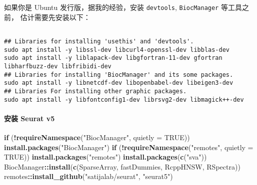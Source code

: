\documentclass[
]{article}
\newenvironment{Shaded}{\begin{snugshade}}{\end{snugshade}}
\newcommand{\ControlFlowTok}[1]{\textcolor[rgb]{0.13,0.29,0.53}{\textbf{#1}}}
\newcommand{\DataTypeTok}[1]{\textcolor[rgb]{0.13,0.29,0.53}{#1}}
\newcommand{\KeywordTok}[1]{\textcolor[rgb]{0.13,0.29,0.53}{\textbf{#1}}}
\newcommand{\NormalTok}[1]{#1}
\newcommand{\OperatorTok}[1]{\textcolor[rgb]{0.81,0.36,0.00}{\textbf{#1}}}
\newcommand{\OtherTok}[1]{\textcolor[rgb]{0.56,0.35,0.01}{#1}}
\newcommand{\StringTok}[1]{\textcolor[rgb]{0.31,0.60,0.02}{#1}}
\begin{document}
如果你是 Ubuntu 发行版，据我的经验，安装 \texttt{devtools}, \texttt{BiocManager} 等工具之前，
估计需要先安装以下：

\begin{tcolorbox}[colback = gray!10, colframe = red!50, width = 16cm, arc = 1mm, auto outer arc, title = {Bash input}]
\begin{verbatim}

## Libraries for installing 'usethis' and 'devtools'.
sudo apt install -y libssl-dev libcurl4-openssl-dev libblas-dev
sudo apt install -y liblapack-dev libgfortran-11-dev gfortran libharfbuzz-dev libfribidi-dev
## Libraries for installing 'BiocManager' and its some packages.
sudo apt install -y libnetcdf-dev libopenbabel-dev libeigen3-dev
## Libraries For installing other graphic packages.
sudo apt install -y libfontconfig1-dev librsvg2-dev libmagick++-dev

\end{verbatim}
\end{tcolorbox}

\hypertarget{ux5b89ux88c5-seurat-v5}{%
\paragraph{安装 Seurat v5}\label{ux5b89ux88c5-seurat-v5}}

\begin{Shaded}
\begin{Highlighting}[]
\ControlFlowTok{if}\NormalTok{ (}\OperatorTok{!}\KeywordTok{requireNamespace}\NormalTok{(}\StringTok{"BiocManager"}\NormalTok{, }\DataTypeTok{quietly =} \OtherTok{TRUE}\NormalTok{))}
    \KeywordTok{install.packages}\NormalTok{(}\StringTok{"BiocManager"}\NormalTok{)}
\ControlFlowTok{if}\NormalTok{ (}\OperatorTok{!}\KeywordTok{requireNamespace}\NormalTok{(}\StringTok{"remotes"}\NormalTok{, }\DataTypeTok{quietly =} \OtherTok{TRUE}\NormalTok{))}
    \KeywordTok{install.packages}\NormalTok{(}\StringTok{"remotes"}\NormalTok{)}
\KeywordTok{install.packages}\NormalTok{(}\KeywordTok{c}\NormalTok{(}\StringTok{"sva"}\NormalTok{))}
\NormalTok{BiocManager}\OperatorTok{::}\KeywordTok{install}\NormalTok{(}\KeywordTok{c}\NormalTok{(}\StringTok{\textquotesingle{}SparseArray\textquotesingle{}}\NormalTok{, }\StringTok{\textquotesingle{}fastDummies\textquotesingle{}}\NormalTok{, }\StringTok{\textquotesingle{}RcppHNSW\textquotesingle{}}\NormalTok{, }\StringTok{\textquotesingle{}RSpectra\textquotesingle{}}\NormalTok{))}
\NormalTok{remotes}\OperatorTok{::}\KeywordTok{install\_github}\NormalTok{(}\StringTok{"satijalab/seurat"}\NormalTok{, }\StringTok{"seurat5"}\NormalTok{)}
\end{Highlighting}
\end{Shaded}
\end{document}

